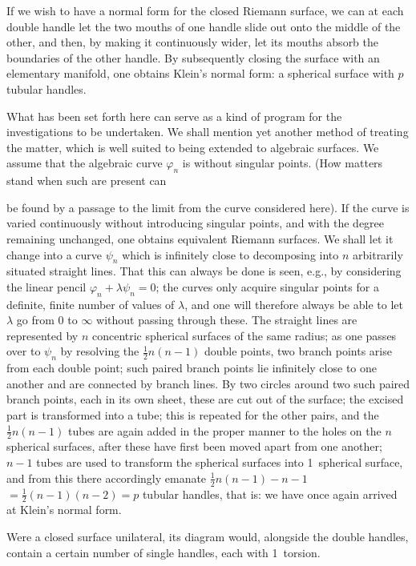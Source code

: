 \documentclass{article}
\begin{document}
If we wish to have a normal form for the closed Riemann surface, we can at each double handle let the two mouths of one handle slide out onto the middle of the other, and then, by making it continuously wider, let its mouths absorb the boundaries of the other handle. By subsequently closing the surface with an elementary manifold, one obtains Klein's normal form: a spherical surface with $p$ tubular handles.

What has been set forth here can serve as a kind of program for the investigations to be undertaken. We shall mention yet another method of treating the matter, which is well suited to being extended to algebraic surfaces. We assume that the algebraic curve $\varphi_n$ is without singular points. (How matters stand when such are present can

be found by a passage to the limit from the curve considered here). If the curve is varied continuously without introducing singular points, and with the degree remaining unchanged, one obtains equivalent Riemann surfaces. We shall let it change into a curve $\psi_n$ which is infinitely close to decomposing into $n$ arbitrarily situated straight lines. That this can always be done is seen, e.g., by considering the linear pencil $\varphi_n + \lambda \psi_n = 0$; the curves only acquire singular points for a definite, finite number of values of $\lambda$, and one will therefore always be able to let $\lambda$ go from $0$ to $\infty$ without passing through these. The straight lines are represented by $n$ concentric spherical surfaces of the same radius; as one passes over to $\psi_n$ by resolving the $\frac{1}{2} n(n - 1)$ double points, two branch points arise from each double point; such paired branch points lie infinitely close to one another and are connected by branch lines. By two circles around two such paired branch points, each in its own sheet, these are cut out of the surface; the excised part is transformed into a tube; this is repeated for the other pairs, and the $\frac{1}{2} n(n - 1)$ tubes are again added in the proper manner to the holes on the $n$ spherical surfaces, after these have first been moved apart from one another; $n - 1$ tubes are used to transform the spherical surfaces into 1~spherical surface, and from this there accordingly emanate $\frac{1}{2} n(n - 1) - n - 1$ $= \frac{1}{2}(n - 1)(n - 2) = p$ tubular handles, that is: we have once again arrived at Klein's normal form.

Were a closed surface unilateral, its diagram would, alongside the double handles, contain a certain number of single handles, each with 1~torsion.
\end{document}

